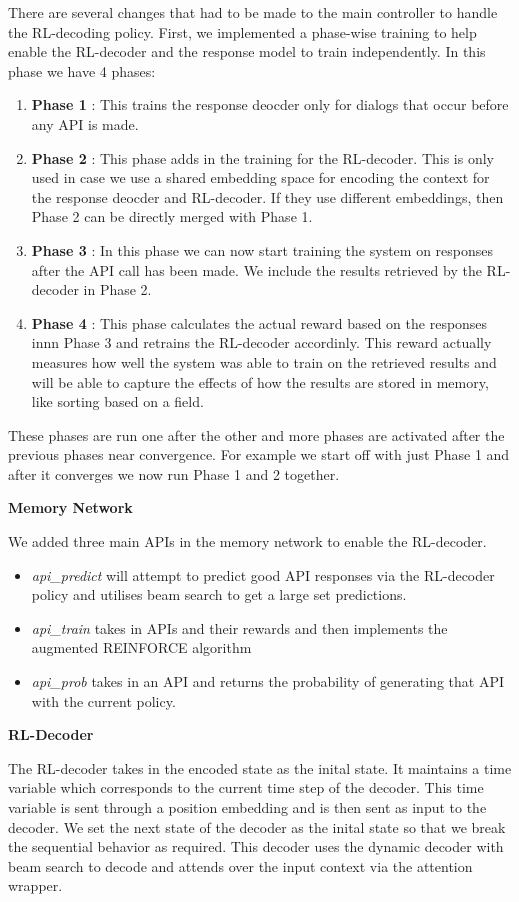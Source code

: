 There are several changes that had to be made to the main controller to handle the RL-decoding policy. First, we implemented a phase-wise training to help enable the RL-decoder and the response model to train independently. In this phase we have 4 phases:
\begin{enumerate}
	\item \textbf{Phase 1} : This trains the response deocder only for dialogs that occur before any API is made.
	\item \textbf{Phase 2} : This phase adds in the training for the RL-decoder. This is only used in case we use a shared embedding space for encoding the context for the response deocder and RL-decoder. If they use different embeddings, then Phase 2 can be directly merged with Phase 1.
	\item \textbf{Phase 3} : In this phase we can now start training the system on responses after the API call has been made. We include the results retrieved by the RL-decoder in Phase 2.
	\item \textbf{Phase 4} : This phase calculates the actual reward based on the responses innn Phase 3 and retrains the RL-decoder accordinly. This reward actually measures how well the system was able to train on the retrieved results and will be able to capture the effects of how the results are stored in memory, like sorting based on a field.
\end{enumerate}

These phases are run one after the other and more phases are activated after the previous phases near convergence. For example we start off with just Phase 1 and after it converges we now run Phase 1 and 2 together.

\noindent\textbf{Memory Network}

We added three main APIs in the memory network to enable the RL-decoder. 

\begin{itemize}
	\item \emph{api\_predict} will attempt to predict good API responses via the RL-decoder policy and utilises beam search to get a large set predictions.
	\item \emph{api\_train} takes in APIs and their rewards and then implements the augmented REINFORCE algorithm
	\item \emph{api\_prob} takes in an API and returns the probability of generating that API with the current policy.
\end{itemize}

\noindent\textbf{RL-Decoder}

The RL-decoder takes in the encoded state as the inital state. It maintains a time variable which corresponds to the current time step of the decoder. This time variable is sent through a position embedding and is then sent as input to the decoder. We set the next state of the decoder as the inital state so that we break the sequential behavior as required. This decoder uses the dynamic decoder with beam search to decode and attends over the input context via the attention wrapper.
